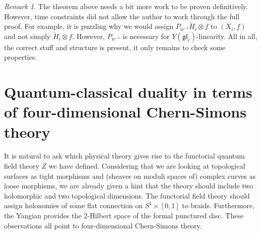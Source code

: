 \documentclass[11pt]{report}
\newtheorem{lemma}[theorem]{Lemma}
\theoremstyle{definition}
\theoremstyle{remark}
\newtheorem*{remark}{Remark}
\theoremstyle{remark}
\begin{document}
\begin{remark}
The theorem above needs a bit more work to be proven definitively. However, time constraints did not allow the author to work through the full proof. For example, it is puzzling why we would assign $P_{w^{-1}} \check H_i \otimes f$ to $(X_i,f)$ and not simply $\check H_i \otimes f$. However, $P_{w^{-1}}$ is necessary for $Y(\mathfrak{gl}_\ell)$-linearity. All in all, the correct stuff and structure is present, it only remains to check some properties.
\end{remark}

%

\section{Quantum-classical duality in terms of four-dimensional Chern-Simons theory}

It is natural to ask which physical theory gives rise to the functorial quantum field theory $Z$ we have defined. Considering that we are looking at topological surfaces as tight morphisms and (sheaves on moduli spaces of) complex curves as loose morphisms, we are already given a hint that the theory should include two holomorphic and two topological dimensions. The functorial field theory should assign holonomies of some flat connection on $S^1 \times [0,1]$ to braids. Furthermore, the Yangian provides the 2-Hilbert space of the formal punctured disc. These observations all point to four-dimensional Chern-Simons theory.
\end{document}
